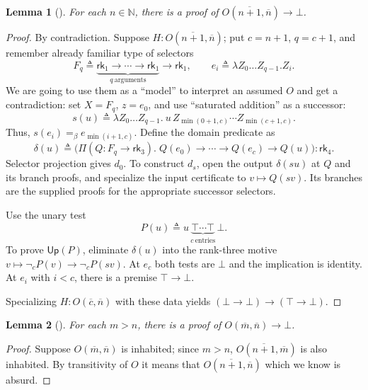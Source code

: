 \documentclass{article}
\newtheorem{lemma}{Lemma}
\theoremstyle{definition}
\theoremstyle{remark}
\newcommand{\rk}[1]{\mathsf{rk}_{#1}}
\newcommand{\nc}{\mathop{\neg}\nolimits_c}
\newcommand{\Up}{\mathsf{Up}}
\begin{document}
\begin{lemma}
    []
    For each $n\in\mathbb{N}$, there is a proof of
    $O(\overline{n+1},\overline{n})\to\bot$.
\end{lemma}
\begin{proof}
    By contradiction. Suppose $H:O(\overline{n+1},
    \overline{n})$;
    put $c=n+1$, $q=c+1$, and remember already familiar
    type of selectors
    \[
        F_q\triangleq\underbrace{
            \rk1\to\cdots\to\rk1}_{
            q\ \mathrm{arguments}}
        \to\rk1,\qquad
        e_i\triangleq\lambda Z_0\ldots Z_{q-1}.Z_i.
    \]
    We are going to use them as a ``model'' to
    interpret an assumed $O$ and get a contradiction:
    set $X=F_q$, $z=e_0$, and use ``saturated
    addition'' as a successor:
    \[
        s(u)\triangleq\lambda Z_0\ldots Z_{q-1}.\
        u\,Z_{\min(0+1,c)}\cdots Z_{\min(c+1,c)}.
    \]
    Thus, $s(e_i)=_\beta e_{\min(i+1,c)}$. Define the
    domain predicate as
    \[
        \delta(u)\triangleq\bigl(\Pi(Q:F_q\to\rk3).\;
        Q(e_0)\to\cdots\to Q(e_c)\to Q(u)\bigr):\rk4.
    \]
    Selector projection gives $d_0$. To construct
    $d_s$, open the output $\delta(su)$ at $Q$ and its
    branch proofs, and specialize the input certificate
    to $v\mapsto Q(sv)$. Its branches are the supplied
    proofs for the appropriate successor selectors.

    Use the unary test
    \[
        P(u)\triangleq u\,\underbrace{\top\cdots\top}_{
            c\ \mathrm{entries}}\,\bot.
    \]
    To prove $\Up(P)$, eliminate $\delta(u)$ into the
    rank-three motive $v\mapsto\nc P(v)\to\nc P(sv)$.
    At $e_c$ both tests are $\bot$ and the implication
    is identity. At $e_i$ with $i<c$, there is a
    premise $\top\to\bot$.

    Specializing $H:O(\overline{c},\overline{n})$ with
    these data yields $(\bot\to\bot)\to(\top\to\bot)$.
\end{proof}

\begin{lemma}
    []
    \label{sep}
    For each $m>n$, there is a proof of
    $O(\overline{m},\overline{n})\to\bot$.
\end{lemma}
\begin{proof}
    Suppose $O(\overline{m},\overline{n})$ is
    inhabited; since $m>n$,
    $O(\overline{n+1},\overline{m})$ is also inhabited.
    By transitivity of $O$ it means that
    $O(\overline{n+1},\overline{n})$ which we know is
    absurd.
\end{proof}
\end{document}
